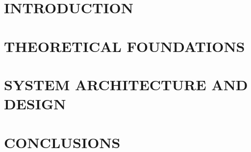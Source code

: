 \documentclass[a4paper,13pt,3p,twoside]{report}
\theoremstyle{definition}
\begin{document}
\renewcommand{\listtablename}{LIST OF TABLES}
{\let\oldnumberline\numberline
\renewcommand{\numberline}{Table~\oldnumberline}
\listoftables}

\glsaddall 
\renewcommand*{\acronymname}{LIST OF ABBREVIATIONS}
\renewcommand*{\entryname}{Abbreviation}
\renewcommand*{\descriptionname}{Definition}

\printnoidxglossary[type=\acronymtype] %


\renewcommand{\figurename}{Figure}
\renewcommand{\tablename}{Table}
\renewcommand{\chaptername}{CHAPTER}



\newpage
\hypersetup{linkcolor=blue}

\pagestyle{fancy}
\fancyhf{}
\fancyhead[RE, LO]{\leftmark}
\fancyfoot[RE, LO]{\thepage}

\chapter{INTRODUCTION}

\newpage
\chapter{THEORETICAL FOUNDATIONS}


\newpage
\chapter{SYSTEM ARCHITECTURE AND DESIGN}


\newpage
\chapter{CONCLUSIONS}

\end{document}
